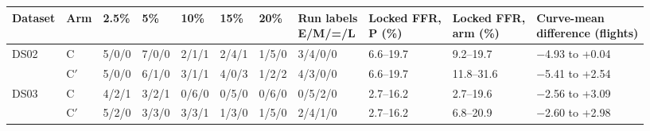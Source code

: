 \begin{tabular}{lllllllllll}
\toprule
Dataset & Arm & 2.5\% & 5\% & 10\% & 15\% & 20\% & \makecell{Run labels\\E/M/=/L} & \makecell{Locked FFR,\\P (\%)} & \makecell{Locked FFR,\\arm (\%)} & \makecell{Curve-mean\\difference (flights)} \\
\midrule
DS02 & C & 5/0/0 & 7/0/0 & 2/1/1 & 2/4/1 & 1/5/0 & 3/4/0/0 & 6.6--19.7 & 9.2--19.7 & $-$4.93 to +0.04 \\
 & C$'$ & 5/0/0 & 6/1/0 & 3/1/1 & 4/0/3 & 1/2/2 & 4/3/0/0 & 6.6--19.7 & 11.8--31.6 & $-$5.41 to +2.54 \\
\midrule
DS03 & C & 4/2/1 & 3/2/1 & 0/6/0 & 0/5/0 & 0/6/0 & 0/5/2/0 & 2.7--16.2 & 2.7--19.6 & $-$2.56 to +3.09 \\
 & C$'$ & 5/2/0 & 3/3/0 & 3/3/1 & 1/3/0 & 1/5/0 & 2/4/1/0 & 2.7--16.2 & 6.8--20.9 & $-$2.60 to +2.98 \\
\bottomrule
\end{tabular}
